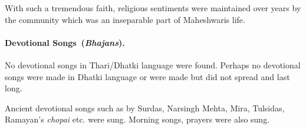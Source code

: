 With such a tremendous faith, religious sentiments were maintained over years
by the community which was an inseparable part of Maheshwaris life.

\paragraph{Devotional Songs~(\textit{Bhajans}).}
No devotional songs in Thari/Dhatki language were found. Perhaps no devotional
songs were made in Dhatki language or were made but did not spread and last
long.

Ancient devotional songs such as by Surdas, Narsingh Mehta, Mira, Tulsidas,
Ramayan's \textit{chopai} etc. were sung. Morning songs, prayers were also
sung.

